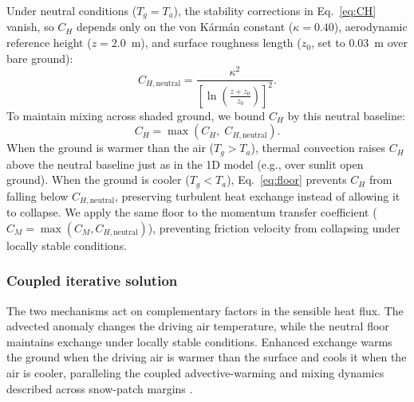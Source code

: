 \documentclass[12pt]{article}
\begin{document}
Under neutral conditions ($T_g = T_a$), the stability corrections in Eq.~\ref{eq:CH} vanish, so $C_H$ depends only on the von K\'arm\'an constant ($\kappa = 0.40$), aerodynamic reference height ($z = 2.0$~m), and surface roughness length ($z_0$, set to $0.03$~m over bare ground):
\begin{equation} \label{eq:neutral}
C_{H,\textrm{neutral}} = \frac{\kappa^2}{\left[ \ln \left( \frac{z + z_0}{z_0} \right) \right]^2}\textrm{.}
\end{equation}
To maintain mixing across shaded ground, we bound $C_H$ by this neutral baseline:
\begin{equation} \label{eq:floor}
C_H = \max \left( C_H, \; C_{H,\textrm{neutral}} \right)\textrm{.}
\end{equation}
\noindent When the ground is warmer than the air ($T_g > T_a$), thermal convection raises $C_H$ above the neutral baseline just as in the 1D model (e.g., over sunlit open ground). When the ground is cooler ($T_g < T_a$), Eq.~\ref{eq:floor} prevents $C_H$ from falling below $C_{H,\textrm{neutral}}$, preserving turbulent heat exchange instead of allowing it to collapse. We apply the same floor to the momentum transfer coefficient ($C_M = \max(C_M, C_{H,\textrm{neutral}})$), preventing friction velocity from collapsing under locally stable conditions.

\subsubsection{Coupled iterative solution}

\noindent The two mechanisms act on complementary factors in the sensible heat flux. The advected anomaly changes the driving air temperature, while the neutral floor maintains exchange under locally stable conditions. Enhanced exchange warms the ground when the driving air is warmer than the surface and cools it when the air is cooler, paralleling the coupled advective-warming and mixing dynamics described across snow-patch margins \citep{mott_2013}.
\end{document}
